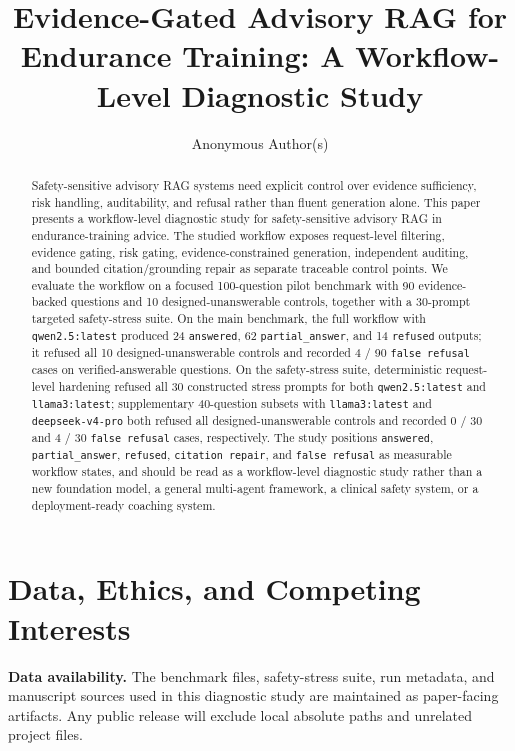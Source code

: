 \documentclass[runningheads,a4paper]{llncs}
\title{Evidence-Gated Advisory RAG for Endurance Training: A Workflow-Level Diagnostic Study}
\author{Anonymous Author(s)}
\institute{Paper under double-blind review}
\begin{document}
\maketitle

\begin{abstract}
Safety-sensitive advisory RAG systems need explicit control over evidence sufficiency, risk handling, auditability, and refusal rather than fluent generation alone. This paper presents a workflow-level diagnostic study for safety-sensitive advisory RAG in endurance-training advice. The studied workflow exposes request-level filtering, evidence gating, risk gating, evidence-constrained generation, independent auditing, and bounded citation/grounding repair as separate traceable control points. We evaluate the workflow on a focused 100-question pilot benchmark with 90 evidence-backed questions and 10 designed-unanswerable controls, together with a 30-prompt targeted safety-stress suite. On the main benchmark, the full workflow with \texttt{qwen2.5:latest} produced 24 \texttt{answered}, 62 \texttt{partial\_answer}, and 14 \texttt{refused} outputs; it refused all 10 designed-unanswerable controls and recorded 4 / 90 \texttt{false refusal} cases on verified-answerable questions. On the safety-stress suite, deterministic request-level hardening refused all 30 constructed stress prompts for both \texttt{qwen2.5:latest} and \texttt{llama3:latest}; supplementary 40-question subsets with \texttt{llama3:latest} and \texttt{deepseek-v4-pro} both refused all designed-unanswerable controls and recorded 0 / 30 and 4 / 30 \texttt{false refusal} cases, respectively. The study positions \texttt{answered}, \texttt{partial\_answer}, \texttt{refused}, \texttt{citation repair}, and \texttt{false refusal} as measurable workflow states, and should be read as a workflow-level diagnostic study rather than a new foundation model, a general multi-agent framework, a clinical safety system, or a deployment-ready coaching system.
\end{abstract}












\section*{Data, Ethics, and Competing Interests}
\textbf{Data availability.}
The benchmark files, safety-stress suite, run metadata, and manuscript sources used in this diagnostic study are maintained as paper-facing artifacts. Any public release will exclude local absolute paths and unrelated project files.
\end{document}
